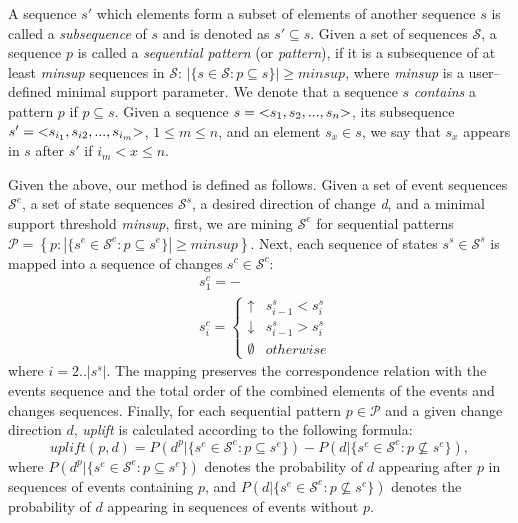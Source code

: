 \documentclass[runningheads,a4paper]{llncs}
\begin{document}
A sequence $s'$ which elements form a subset of elements of another sequence $s$ is called a \textit{subsequence} of $s$ and is denoted as $s'\subseteq s$.
Given a set of sequences $\mathcal{S}$, a sequence $p$ is called a \textit{sequential pattern} (or \textit{pattern}), if it is a subsequence of at least \textit{minsup} sequences in $\mathcal{S}$: $|\{s\in\mathcal{S}:p\subseteq s\}|\geq\textit{minsup}$, where \textit{minsup} is a user--defined minimal support parameter.
We denote that a sequence $s$ \textit{contains} a pattern $p$ if $p\subseteq s$.
Given a sequence $s=\text{\textless} s_1,s_2,...,s_n\text{\textgreater}$, its subsequence $s'=\text{\textless} s_{i_1}, s_{i2}, ..., s_{i_m}\text{\textgreater}$, $1\leq m\leq n$, and an element $s_x\in s$, we say that $s_x$ appears in $s$ after $s'$ if $i_m<x\leq n$.

Given the above, our method is defined as follows.
Given a set of event sequences $\mathcal{S}^e$, a set of state sequences $\mathcal{S}^s$, a desired direction of change \textit{d}, and a minimal support threshold \textit{minsup}, first, we are mining $\mathcal{S}^e$ for sequential patterns $\mathcal{P}=\left\{p:|\{s^e\in\mathcal{S}^e:p\subseteq s^e\}|\geq\textit{minsup}\right\}$.
Next, each sequence of states $s^s\in\mathcal{S}^s$ is mapped into a sequence of changes $s^c\in\mathcal{S}^c$:
\begin{equation*}
\begin{split}
&s^c_1=-\\
&s^c_i=\begin{cases}
	\uparrow & s^s_{i-1}<s^s_i \\
	\downarrow & s^s_{i-1}>s^s_i \\
	\emptyset & otherwise
\end{cases}
\end{split}
\end{equation*}
where $i=2..|s^s|$.
The mapping preserves the correspondence relation with the events sequence and the total order of the combined elements of the events and changes sequences.
Finally, for each sequential pattern $p\in\mathcal{P}$ and a given change direction $d$, \textit{uplift} is calculated according to the following formula:
\begin{equation*}
\textit{uplift}(p,d)=P(d^p|\{s^e\in\mathcal{S}^e:p\subseteq s^e\})-P(d|\{s^e\in\mathcal{S}^e:p\not\subseteq s^e\}),
\end{equation*}
where $P(d^p|\{s^e\in\mathcal{S}^e:p\subseteq s^e\})$ denotes the probability of $d$ appearing after $p$ in sequences of events containing $p$, and $P(d|\{s^e\in\mathcal{S}^e:p\not\subseteq s^e\})$ denotes the probability of $d$ appearing in sequences of events without $p$.
\end{document}
